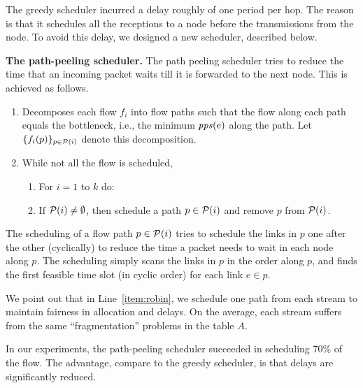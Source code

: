 \documentclass[11pt]{article}
\newenvironment{proof sketch}[1]{\noindent {\emph{Proof sketch of #1:}}}{\hfill \qed}
\newcommand{\pps}{\text{\emph{pps}}}
\begin{document}
The greedy scheduler incurred a delay roughly of one period per hop.
The reason is that it schedules all the receptions to a node before
the transmissions from the node. To avoid this delay, we designed a
new scheduler, described below.

\medskip
\noindent
\textbf{The path-peeling scheduler.}  The path peeling scheduler tries
to reduce the time that an incoming packet waits till it is forwarded
to the next node. This is achieved as follows.
\begin{enumerate}
\item Decomposes each flow $f_i$ into flow paths such that the flow
  along each path equals the bottleneck, i.e., the minimum $\pps(e)$
  along the path.  Let $\{f_i(p)\}_{p\in {\cal{P}}(i)}$ denote this
  decomposition.
\item While not all the flow is scheduled,
  \begin{enumerate}
  \item \label{item:robin} For $i=1$ to $k$ do:
  \item If ${\cal P}(i)\neq \emptyset$, then schedule a path $p\in
    {\cal P}(i)$ and remove $p$ from ${\cal P}(i)$.
  \end{enumerate}
\end{enumerate}
The scheduling of a flow path $p\in {\cal P}(i)$ tries to schedule the
links in $p$ one after the other (cyclically) to reduce the time a
packet needs to wait in each node along $p$. The scheduling simply
scans the links in $p$ in the order along $p$, and finds the first
feasible time slot (in cyclic order) for each link $e\in p$.

We point out that in Line~\ref{item:robin}, we schedule one path from
each stream to maintain fairness in allocation and delays. On the
average, each stream suffers from the same ``fragmentation'' problems
in the table $A$.

In our experiments, the path-peeling scheduler succeeded in scheduling
70\% of the flow. The advantage, compare to the greedy scheduler, is
that delays are significantly reduced.
\end{document}
